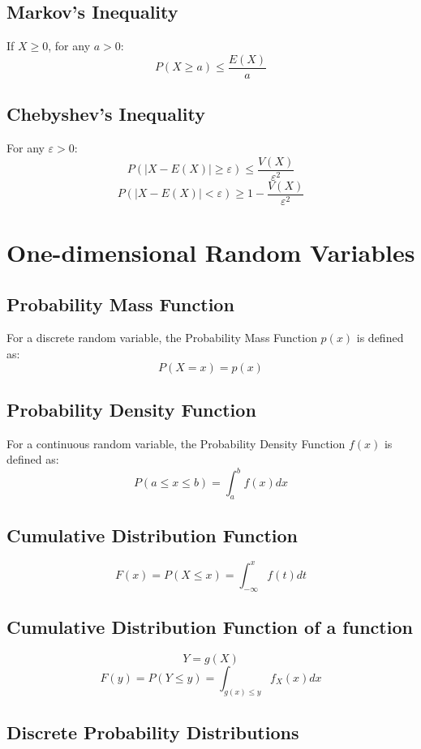 \documentclass{article}
\begin{document}
\subsection{Markov's Inequality}
If \( X \geq 0 \), for any \( a > 0 \):
\[
    P(X \geq a) \leq \frac{E(X)}{a}
\]

\subsection{Chebyshev's Inequality}
For any \( \varepsilon > 0 \):
\[
    P(|X-E(X)| \ge \varepsilon) \le \frac{V(X)}{\varepsilon^2}
\]
\[
    P(|X-E(X)| < \varepsilon) \ge 1 - \frac{V(X)}{\varepsilon^2}
\]

\newpage
\section{One-dimensional Random Variables}

\subsection{Probability Mass Function}
For a discrete random variable, the Probability Mass Function \( p(x) \) is defined as:
\[
    P(X=x) = p(x)
\]

\subsection{Probability Density Function}
For a continuous random variable, the Probability Density Function \( f(x) \) is defined as:
\[
    P(a \le x \le b) = \int_{a}^{b} f(x)dx
\]

\subsection{Cumulative Distribution Function}
\[
    F(x) = P(X \le x) = \int_{-\infty}^{x} f(t)dt
\]

\subsection{Cumulative Distribution Function of a function}
\[
    Y=g(X)
\]
\[
    F(y) = P(Y \le y) = \int_{g(x) \le y} f_X(x)dx
\]

\subsection{Discrete Probability Distributions}
\end{document}
